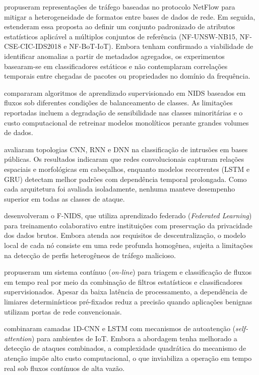  propuseram representações de tráfego baseadas no protocolo NetFlow para mitigar a
heterogeneidade de formatos entre bases de dados de rede. Em seguida,  estenderam essa
proposta ao definir um conjunto padronizado de atributos estatísticos aplicável a múltiplos conjuntos de referência
(NF-UNSW-NB15, NF-CSE-CIC-IDS2018 e NF-BoT-IoT). Embora tenham confirmado a viabilidade de identificar anomalias a
partir de metadados agregados, os experimentos basearam-se em classificadores estáticos e não contemplaram correlações
temporais entre chegadas de pacotes ou propriedades no domínio da frequência.

 compararam algoritmos de aprendizado supervisionado em NIDS baseados em fluxos sob
diferentes condições de balanceamento de classes. As limitações reportadas incluem a degradação de sensibilidade nas
classes minoritárias e o custo computacional de retreinar modelos monolíticos perante grandes volumes de dados.

 avaliaram topologias CNN, RNN e DNN na classificação de intrusões em bases públicas.
Os resultados indicaram que redes convolucionais capturam relações espaciais e morfológicas em cabeçalhos, enquanto
modelos recorrentes (LSTM e GRU) detectam melhor padrões com dependência temporal prolongada. Como cada arquitetura
foi avaliada isoladamente, nenhuma manteve desempenho superior em todas as classes de ataque.

 desenvolveram o F-NIDS, que utiliza aprendizado federado (\emph{Federated Learning}) para
treinamento colaborativo entre instituições com preservação da privacidade dos dados brutos. Embora atenda aos
requisitos de descentralização, o modelo local de cada nó consiste em uma rede profunda homogênea, sujeita a
limitações na detecção de perfis heterogêneos de tráfego malicioso.

 propuseram um sistema contínuo (\emph{on-line}) para triagem e classificação de fluxos em
tempo real por meio da combinação de filtros estatísticos e classificadores supervisionados. Apesar da baixa latência
de processamento, a dependência de limiares determinísticos pré-fixados reduz a precisão quando aplicações benignas
utilizam portas de rede convencionais.

 combinaram camadas 1D-CNN e LSTM com mecanismos de autoatenção (\emph{self-attention})
para ambientes de IoT. Embora a abordagem tenha melhorado a detecção de ataques combinados, a complexidade quadrática
do mecanismo de atenção impõe alto custo computacional, o que inviabiliza a operação em tempo real sob fluxos contínuos
de alta vazão.

